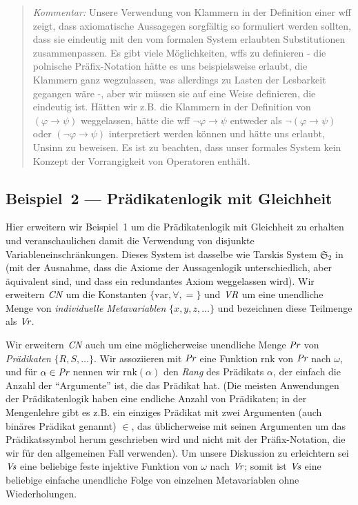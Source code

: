 {\footnotesize\begin{quotation}
{\em Kommentar:} Unsere Verwendung von Klammern in der Definition einer wff zeigt, dass axiomatische Aussagegen sorgfältig so formuliert werden sollten, dass sie eindeutig mit den vom formalen System erlaubten Substitutionen zusammenpassen. Es gibt viele Möglichkeiten, wffs zu definieren - die polnische Präfix-Notation hätte es uns beispielsweise erlaubt, die Klammern ganz wegzulassen, was allerdings zu Lasten der Lesbarkeit gegangen wäre -, aber wir müssen sie auf eine Weise definieren, die eindeutig ist.  Hätten wir z.B. die Klammern in der Definition von $(\varphi\to \psi)$ weggelassen, hätte die wff $\lnot\varphi\to \psi$ entweder als $\lnot(\varphi\to\psi)$ oder $(\lnot\varphi\to\psi)$ interpretiert werden können und hätte uns erlaubt, Unsinn zu beweisen.  Es ist zu beachten, dass unser formales System kein Konzept der Vorrangigkeit von Operatoren enthält.
\end{quotation}}

\begin{sloppy}
\subsection{Beispiel~2 --- Prädikatenlogik mit Gleichheit}
\end{sloppy}

Hier erweitern wir Beispiel~1 um die Prädikatenlogik mit Gleichheit zu erhalten und veranschaulichen damit die Verwendung von disjunkte Variableneinschränkungen.  Dieses System ist dasselbe wie Tarskis System $\mathfrak{S}_2$ in \cite{Tarski1965} (mit der Ausnahme, dass die Axiome der Aussagenlogik unterschiedlich, aber äquivalent sind, und dass ein redundantes Axiom weggelassen wird).  Wir erweitern $\mbox{\em CN}$ um die Konstanten $\{\mbox{var},\forall,=\}$ und $\mbox{\em VR}$ um eine unendliche Menge von {\em individuelle Metavariablen} $\{x,y,z,\ldots\}$ und bezeichnen diese Teilmenge als $\mbox{\em Vr}$.

Wir erweitern $\mbox{\em CN}$ auch um eine möglicherweise unendliche Menge $\mbox{\em Pr}$ von {\em Prädikaten} $\{R,S,\ldots\}$.  Wir assoziieren mit $\mbox{\em Pr}$ eine Funktion $\mbox{rnk}$ von $\mbox{\em Pr}$ nach $\omega$, und für $\alpha\in \mbox{\em Pr}$ nennen wir $\mbox{rnk}(\alpha)$ den {\em Rang} des Prädikats $\alpha$, der einfach die Anzahl der "`Argumente"' ist, die das Prädikat hat.  (Die meisten Anwendungen der Prädikatenlogik haben eine endliche Anzahl von Prädikaten; in der Mengenlehre gibt es z.B. ein einziges Prädikat mit zwei Argumenten (auch binäres Prädikat genannt) $\in$, das üblicherweise mit seinen Argumenten um das Prädikatssymbol herum geschrieben wird und nicht mit der Präfix-Notation, die wir für den allgemeinen Fall verwenden).
Um unsere Diskussion zu erleichtern sei $\mbox{\em Vs}$ eine beliebige feste injektive Funktion von $\omega$ nach $\mbox{\em Vr}$; somit ist $\mbox{\em Vs}$ eine beliebige einfache unendliche Folge von einzelnen Metavariablen ohne Wiederholungen.

